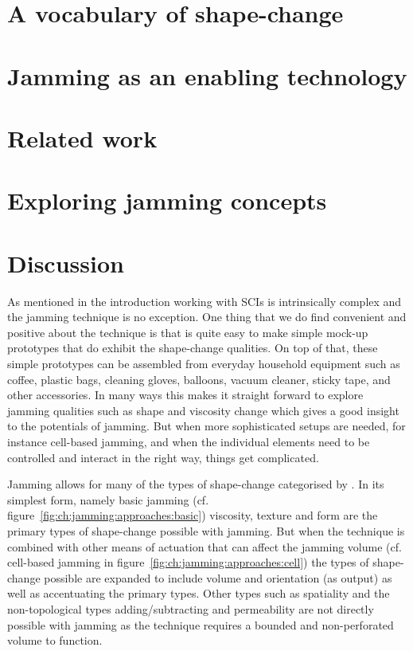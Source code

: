 \section{A vocabulary of shape-change}
\label{ch:jamming:shape-change} 


\section{Jamming as an enabling technology}
\label{ch:jamming:enabling-technology} 


\section{Related work}
\label{ch:jamming:related-work} 


\section{Exploring jamming concepts}
\label{ch:jamming:concepts} 


\section{Discussion}

As mentioned in the introduction working with SCIs is intrinsically complex and the jamming technique is no exception.
One thing that we do find convenient and positive about the technique is that is quite easy to make simple mock-up prototypes that do exhibit the shape-change qualities.
On top of that, these simple prototypes can be assembled from everyday household equipment such as coffee, plastic bags, cleaning gloves, balloons, vacuum cleaner, sticky tape, and other accessories.
In many ways this makes it straight forward to explore jamming qualities such as shape and viscosity change which gives a good insight to the potentials of jamming.
But when more sophisticated setups are needed, for instance cell-based jamming, and when the individual elements need to be controlled and interact in the right way, things get complicated.

Jamming allows for many of the types of shape-change categorised by \citet{rasmussen2012shape}.
In its simplest form, namely basic jamming (cf. figure~\ref{fig:ch:jamming:approaches:basic}) viscosity, texture and form are the primary types of shape-change possible with jamming.
But when the technique is combined with other means of actuation that can affect the jamming volume (cf. cell-based jamming in figure~\ref{fig:ch:jamming:approaches:cell}) the types of shape-change possible are expanded to include volume and orientation (as output) as well as accentuating the primary types.
Other types such as spatiality and the non-topological types adding/subtracting and permeability are not directly possible with jamming as the technique requires a bounded and non-perforated volume to function.

